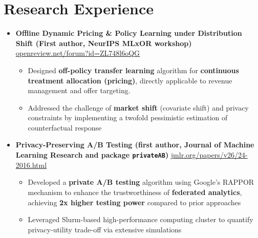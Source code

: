 \documentclass[letterpaper,11pt]{article}
\begin{document}
\section{Research Experience}
\begin{itemize}[leftmargin=0in, label={}]
\item
\textbf{Offline Dynamic Pricing \& Policy Learning under Distribution Shift (First author, NeurIPS MLxOR workshop)} \href{https://openreview.net/forum?id=ZL748l6oQG}{openreview.net/forum?id=ZL748l6oQG}
\\
\vspace{-5.55pt}
\begin{itemize}[leftmargin=0.14in]
	\item \small 
	Designed \textbf{off-policy transfer learning} algorithm for \textbf{continuous treatment allocation (pricing)}, directly applicable to revenue management and offer targeting.
	\vspace{-1.5pt}
    \item \small %
    Addressed the challenge of \textbf{market shift} (covariate shift) and privacy constraints by implementing a twofold pessimistic estimation of counterfactual response
\end{itemize}
\vspace{-11.5pt}
\item
\textbf{Privacy-Preserving A/B Testing (first author, Journal of Machine Learning Research and package \texttt{privateAB})}  \href{https://jmlr.org/papers/v26/24-2016.html}{\url{jmlr.org/papers/v26/24-2016.html}}	
\\\vspace{-5.55pt}
\begin{itemize}[leftmargin=0.14in]
	\item \small 
	Developed a \textbf{private A/B testing} algorithm using Google's RAPPOR mechanism to enhance the trustworthiness of \textbf{federated analytics}, achieving \textbf{2x higher testing power} compared to prior approaches
	\vspace{-1.5pt}
	\vspace{-1.5pt}
	\item \small %
	Leveraged  Slurm-based high-performance computing cluster
	to quantify   privacy-utility  trade-off
	via extensive simulations

\end{itemize}
\end{itemize}
\end{document}
